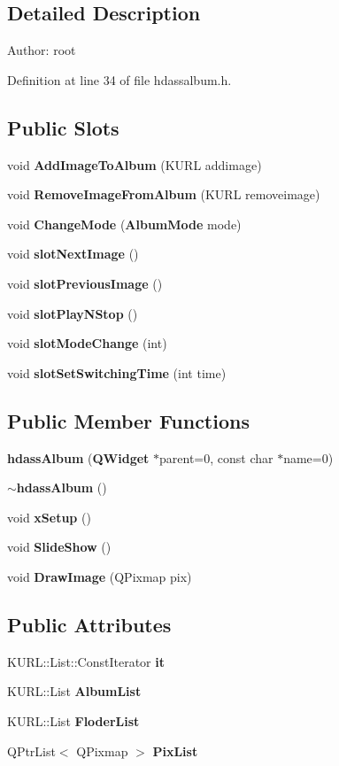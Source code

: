 \subsection{Detailed Description}
\begin{Desc}
\item[Author:]root \end{Desc}




Definition at line 34 of file hdassalbum.h.\subsection*{Public Slots}
\begin{CompactItemize}
\item 
void {\bf Add\-Image\-To\-Album} (KURL addimage)
\item 
void {\bf Remove\-Image\-From\-Album} (KURL removeimage)
\item 
void {\bf Change\-Mode} ({\bf Album\-Mode} mode)
\item 
void {\bf slot\-Next\-Image} ()
\item 
void {\bf slot\-Previous\-Image} ()
\item 
void {\bf slot\-Play\-NStop} ()
\item 
void {\bf slot\-Mode\-Change} (int)
\item 
void {\bf slot\-Set\-Switching\-Time} (int time)
\end{CompactItemize}
\subsection*{Public Member Functions}
\begin{CompactItemize}
\item 
{\bf hdass\-Album} ({\bf QWidget} $\ast$parent=0, const char $\ast$name=0)
\item 
{\bf $\sim$hdass\-Album} ()
\item 
void {\bf x\-Setup} ()
\item 
void {\bf Slide\-Show} ()
\item 
void {\bf Draw\-Image} (QPixmap pix)
\end{CompactItemize}
\subsection*{Public Attributes}
\begin{CompactItemize}
\item 
KURL::List::Const\-Iterator {\bf it}
\item 
KURL::List {\bf Album\-List}
\item 
KURL::List {\bf Floder\-List}
\item 
QPtr\-List$<$ QPixmap $>$ {\bf Pix\-List}
\end{CompactItemize}
